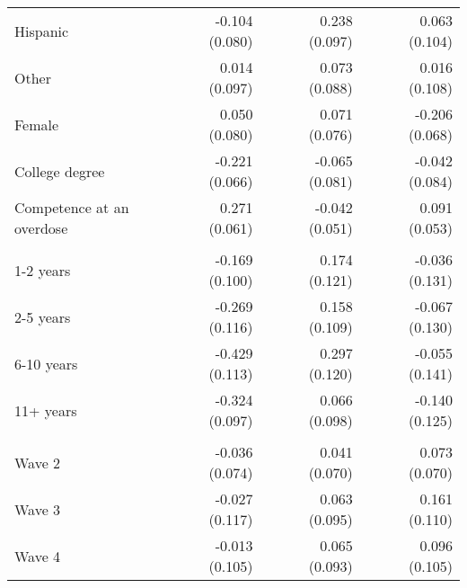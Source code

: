 \begin{table}[htbp]
\begin{adjustbox}{max width=\linewidth}
\begin{tabular}{l*{6}{D{.}{.}{-1}}}
Hispanic        &                  &-0.104 (0.080)         &                  &0.238\sym{*} (0.097)         &                  &0.063 (0.104)         \\
Other           &                  &0.014 (0.097)         &                  &0.073 (0.088)         &                  &0.016 (0.108)         \\
Female          &                  &0.050 (0.080)         &                  &0.071 (0.076)         &                  &-0.206\sym{**} (0.068)         \\
College degree  &                  &-0.221\sym{***} (0.066)         &                  &-0.065 (0.081)         &                  &-0.042 (0.084)         \\
Competence at an overdose&                  &0.271\sym{***} (0.061)         &                  &-0.042 (0.051)         &                  &0.091 (0.053)         \\
&                  &                  &                  &                  &                  &                  \\
1-2 years       &                  &-0.169 (0.100)         &                  &0.174 (0.121)         &                  &-0.036 (0.131)         \\
2-5 years       &                  &-0.269\sym{*} (0.116)         &                  &0.158 (0.109)         &                  &-0.067 (0.130)         \\
6-10 years      &                  &-0.429\sym{***} (0.113)         &                  &0.297\sym{*} (0.120)         &                  &-0.055 (0.141)         \\
11+ years       &                  &-0.324\sym{***} (0.097)         &                  &0.066 (0.098)         &                  &-0.140 (0.125)         \\
      &                  &                  &                  &                  &                  &                  \\
Wave 2          &                  &-0.036 (0.074)         &                  &0.041 (0.070)         &                  &0.073 (0.070)         \\
Wave 3          &                  &-0.027 (0.117)         &                  &0.063 (0.095)         &                  &0.161 (0.110)         \\
Wave 4          &                  &-0.013 (0.105)         &                  &0.065 (0.093)         &                  &0.096 (0.105)         \\

\end{tabular}
\end{adjustbox}
\end{table}
